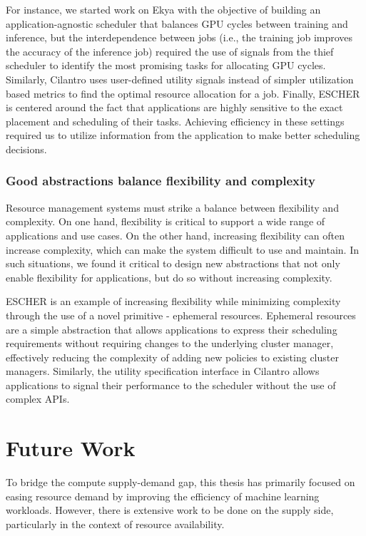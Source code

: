 For instance, we started work on Ekya with the objective of building an application-agnostic scheduler that balances GPU cycles between training and inference, but the interdependence between jobs (i.e., the training job improves the accuracy of the inference job) required the use of signals from the thief scheduler to identify the most promising tasks for allocating GPU cycles. Similarly, Cilantro uses user-defined utility signals instead of simpler utilization based metrics to find the optimal resource allocation for a job. Finally, ESCHER is centered around the fact that applications are highly sensitive to the exact placement and scheduling of their tasks. Achieving efficiency in these settings required us to utilize information from the application to make better scheduling decisions.

\subsubsection{Good abstractions balance flexibility and complexity}
Resource management systems must strike a balance between flexibility and complexity. On one hand, flexibility is critical to support a wide range of applications and use cases. On the other hand, increasing flexibility can often increase complexity, which can make the system difficult to use and maintain. In such situations, we found it critical to design new abstractions that not only enable flexibility for applications, but do so without increasing complexity. 

ESCHER is an example of increasing flexibility while minimizing complexity through the use of a novel primitive - ephemeral resources. Ephemeral resources are a simple abstraction that allows applications to express their scheduling requirements without requiring changes to the underlying cluster manager, effectively reducing the complexity of adding new policies to existing cluster managers. Similarly, the utility specification interface in Cilantro allows applications to signal their performance to the scheduler without the use of complex APIs. 

\section{Future Work}

To bridge the compute supply-demand gap, this thesis has primarily focused on easing resource demand by improving the efficiency of machine learning workloads. However, there is extensive work to be done on the supply side, particularly in the context of resource availability.

